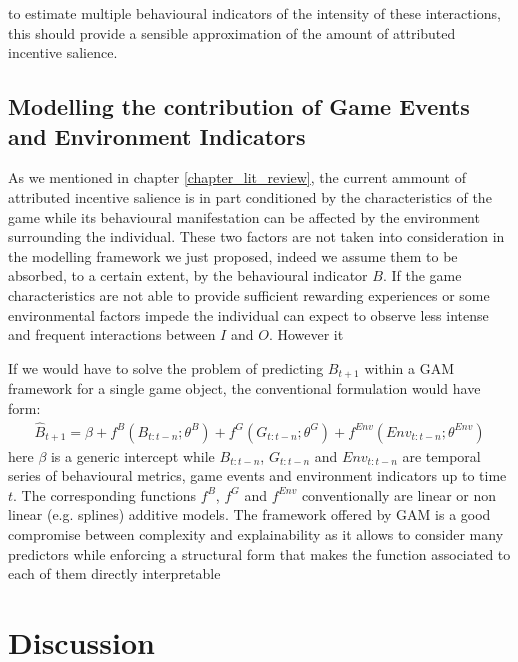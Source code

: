 to estimate multiple behavioural indicators of the intensity of these interactions, this should provide a sensible approximation of the amount of attributed incentive salience. 


\subsection{Modelling the contribution of Game Events and Environment Indicators}
\label{modelling_env_and_game_elements}
As we mentioned in chapter \ref{chapter_lit_review}, the current ammount of attributed incentive salience is in part conditioned by the characteristics of the game while its behavioural manifestation can be affected by the environment surrounding the individual. These two factors are not taken into consideration in the modelling framework we just proposed, indeed we assume them to be absorbed, to a certain extent, by the behavioural indicator $B$. If the game characteristics are not able to provide sufficient rewarding experiences or some environmental factors impede the individual can expect to observe less intense and frequent interactions between $I$ and $O$. However it 

If we would have to solve the problem of predicting $B_{t+1}$ within a GAM framework for a single game object, the conventional formulation would have form:
\begin{gather}
\label{gam}
    \widehat{B}_{t+1} = \beta + f^{B}(B_{t:t-n};\theta^{B}) + f^{G}(G_{t:t-n};\theta^{G}) + f^{Env}(Env_{t:t-n};\theta^{Env})
\end{gather}
here $\beta$ is a generic intercept while $B_{t:t-n}$, $G_{t:t-n}$ and $Env_{t:t-n}$ are temporal series of behavioural metrics, game events and environment indicators up to time $t$. The corresponding functions $f^{B}$, $f^{G}$ and $f^{Env}$ conventionally are linear or non linear (e.g. splines) additive models. The framework offered by GAM is a good compromise between complexity and explainability as it allows to consider many predictors while enforcing a structural form that makes the function associated to each of them directly interpretable \cite{hastie2017generalized}



\section{Discussion}
\lorem